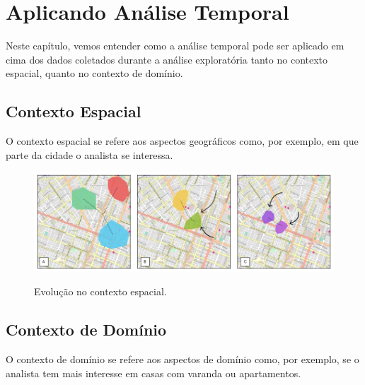 \chapter{Aplicando Análise Temporal}
\label{chap:aplicando}

Neste capítulo, vemos entender como a análise temporal pode ser aplicado em cima dos dados coletados durante a análise exploratória tanto no contexto espacial, quanto no contexto de domínio.

\section{Contexto Espacial}

O contexto espacial se refere aos aspectos geográficos como, por exemplo, em que parte da cidade o analista se interessa.

\begin{figure}[t]
	\caption{Evolução no contexto espacial.}
	\centering
	\includegraphics[width=\textwidth]{imagens/analise-contexto-espacial}
	\mfonte
	\label{fig:analise-contexto-espacial}
\end{figure}

\section{Contexto de Domínio}

O contexto de domínio se refere aos aspectos de domínio como, por exemplo, se o analista tem mais interesse em casas com varanda ou apartamentos.